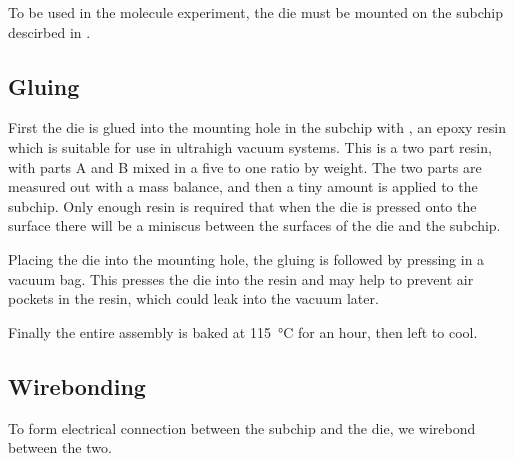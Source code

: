 To be used in the molecule experiment, the die must be mounted on the subchip
descirbed in .

\subsection{Gluing}

First the die is glued into the mounting hole in the subchip with , an epoxy resin which is suitable for use in ultrahigh vacuum systems.
This is a two part resin, with parts A and B mixed in a five to one ratio by
weight. The two parts are measured out with a mass balance, and then a tiny
amount is applied to the subchip. Only enough resin is required that when the
die is pressed onto the surface there will be a miniscus between the surfaces
of the die and the subchip.

Placing the die into the mounting hole, the gluing is followed by pressing in a
vacuum bag. This presses the die into the resin and may help to prevent air
pockets in the resin, which could leak into the vacuum later.

Finally the entire assembly is baked at \SI{115}{\celsius} for an hour, then
left to cool.

\subsection{Wirebonding}

To form electrical connection between the subchip and the die, we wirebond
between the two.
